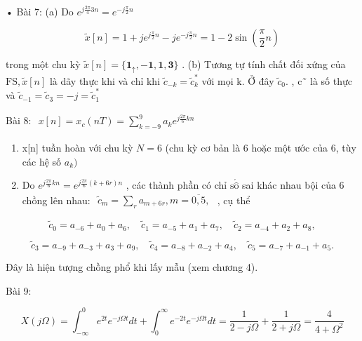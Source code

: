 \documentclass[
  10
]{article}
\begin{document}
• Bài 7: (a) Do
\(e ^ { j { \frac { 2 \pi } { 4 } } 3 n } = e ^ { - j { \frac { \pi } { 2 } } n }\)

\[
\tilde {x} [ n ] = 1 + j e ^ {j \frac {\pi}{2} n} - j e ^ {- j \frac {\pi}{2} n} = 1 - 2 \sin \left(\frac {\pi}{2} n\right)
\]

trong một chu kỳ
\(\tilde { x } [ n ] = \{ \boldsymbol { 1 } _ { \uparrow } , - \boldsymbol { 1 } , \boldsymbol { 1 } , \boldsymbol { 3 } \}\)
. (b) Tương tự tính chất đối xứng của
\(\mathrm { F S } , \tilde { x } [ n ]\) là dãy thực khi và chỉ khi
\(\tilde { c } _ { - k } = \tilde { c } _ { k } ^ { \ast }\) với mọi k.
Ở đây \({ \tilde { c } } _ { 0 } .\) , c˜ là số thực và
\(\tilde { c } _ { - 1 } = \tilde { c } _ { 3 } = - j = \tilde { c } _ { 1 } ^ { * }\)

Bài 8:
\(\begin{array} { r } { x [ n ] = x _ { c } ( n T ) = \sum _ { k = - 9 } ^ { 9 } a _ { k } e ^ { j \frac { 2 \pi } { 6 } k n } } \end{array}\)

\begin{enumerate}
\def\labelenumi{\alph{enumi}.}
\item
  x{[}n{]} tuần hoàn với chu kỳ \(N = 6\) (chu kỳ cơ bản là 6 hoặc một
  ước của 6, tùy các hệ số \(a _ { k } )\)
\item
  Do
  \(e ^ { j \frac { 2 \pi } { 6 } k n } = e ^ { j \frac { 2 \pi } { 6 } ( k + 6 r ) n }\)
  , các thành phần có chỉ
  \(\mathrm { s } \acute { \hat { \mathrm { o } } }\) sai khác nhau bội
  của 6 chồng lên nhau:
  \(\begin{array} { r } { \tilde { c } _ { m } = \sum _ { r } a _ { m + 6 r } , m = \overline { { 0 , 5 } } , } \end{array}\)
  , cụ thể
\end{enumerate}

\[
\tilde {c} _ {0} = a _ {- 6} + a _ {0} + a _ {6}, \quad \tilde {c} _ {1} = a _ {- 5} + a _ {1} + a _ {7}, \quad \tilde {c} _ {2} = a _ {- 4} + a _ {2} + a _ {8},
\]

\[
\tilde {c} _ {3} = a _ {- 9} + a _ {- 3} + a _ {3} + a _ {9}, \quad \tilde {c} _ {4} = a _ {- 8} + a _ {- 2} + a _ {4}, \quad \tilde {c} _ {5} = a _ {- 7} + a _ {- 1} + a _ {5}.
\]

Đây là hiện tượng chồng phổ khi lấy mẫu (xem chương 4).

Bài 9:

\[
X (j \Omega) = \int_ {- \infty} ^ {0} e ^ {2 t} e ^ {- j \Omega t} d t + \int_ {0} ^ {\infty} e ^ {- 2 t} e ^ {- j \Omega t} d t = \frac {1}{2 - j \Omega} + \frac {1}{2 + j \Omega} = \frac {4}{4 + \Omega^ {2}}
\]
\end{document}
